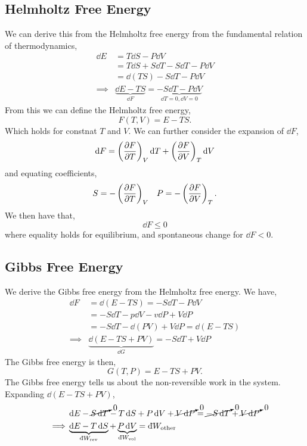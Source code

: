 \documentclass{book}
\newcommand{\dbar}{\mathrm{d}\hspace*{-0.08em}\bar{}\hspace*{0.1em}}
\begin{document}
\subsection{Helmholtz Free Energy}
We can derive this from the Helmholtz free energy from the fundamental relation of thermodynamics,
\begin{equation}
	\begin{split}
		\dd{E} & = T\dd{S} - P\dd{V} \\
		& = T\dd{S} + S\dd{T} - S\dd{T} - P\dd{V} \\
		& = \dd{(TS)} - S\dd{T} - P\dd{V} \\
		\implies & \underbrace{\dd{E - TS}}_{\dd{F}} = \underbrace{- S \dd{T} - P \dd{V}}_{\dd{T} = 0, \dd{V} = 0}
	\end{split}
\end{equation}
From this we can define the Helmholtz free energy,
\begin{equation}
	\boxed{F(T,V) = E - TS}.
\end{equation}
Which holds for constnat $T$ and $V$. We can further consider the expansion of $\dd{F}$,
\begin{equation}
	\dd{F} = \left(\pdv{F}{T}\right)_V \dd{T} + \left(\pdv{F}{V}\right)_T \dd{V}
\end{equation}
and equating coefficients,
\begin{align}
	S = -\left(\pdv{F}{T}\right)_V && P = -\left(\pdv{F}{V}\right)_T.
\end{align}
We then have that,
\begin{equation}
	\dd{F} \leq 0
\end{equation}
where equality holds for equilibrium, and spontaneous change for $\dd{F} < 0$.
\subsection{Gibbs Free Energy}
We derive the Gibbs free energy from the Helmholtz free energy. We have,
\begin{equation}
	\begin{split}
		\dd{F} & = \dd{(E - TS)} = -S\dd{T} - P \dd{V} \\
		& = -S\dd{T} - p\dd{V} -v\dd{P} + V\dd{P} \\
		& = -S\dd{T} - \dd{(PV)} + V\dd{P} = \dd{(E - TS)} \\
		\implies & \underbrace{\dd{(E - TS + PV)}}_{\dd{G}} = -S\dd{T} + V\dd{P}
	\end{split}
\end{equation}
The Gibbs free energy is then,
\begin{equation}
	\boxed{G(T,P) = E - TS + PV}.
\end{equation}
The Gibbs free energy tells us about the non-reversible work in the system. Expanding $\dd{(E - TS + PV)}$, 
\begin{equation}
	\begin{split}
	& \dd{E} - \cancelto{0}{S\dd{T}} - T\dd{S} + P\dd{V} + \cancelto{0}{V\dd{P}} = \cancelto{0}{-S\dd{T}} + \cancelto{0}{V \dd{P}} \\
	\implies & \underbrace{\dd{E} - T\dd{S}}_{\dbar W_{\text{rev}}} + \underbrace{P\dd{V}}_{\dbar W_{\text{vol}}} = \dbar W_{\text{other}}
	\end{split}
\end{equation}
\end{document}
